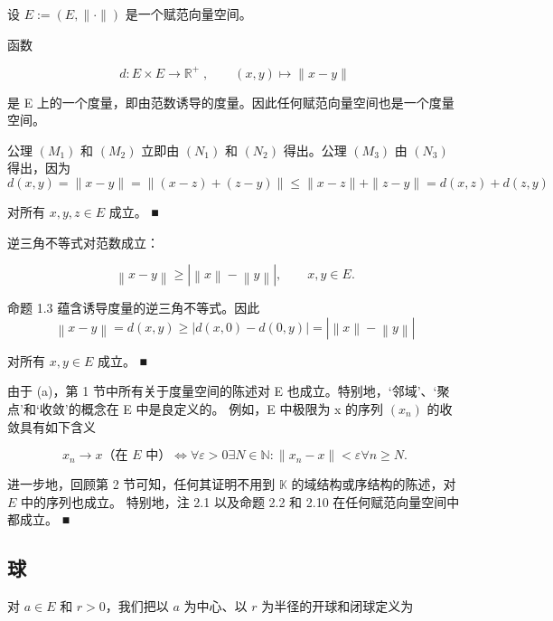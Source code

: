 \begin{remark}

设 $ E := (E, \|\cdot\|) $ 是一个赋范向量空间。

\begin{items}
\item

函数

\[
d\colon E\times E\to\mathbb{R}^{+}\;,\qquad(x,y)\mapsto\|x-y\|
\]

是 E 上的一个度量，即由范数诱导的度量。因此任何赋范向量空间也是一个度量空间。

\proofhead
公理 $(M_{1})$ 和 $(M_{2})$ 立即由 $(N_{1})$ 和 $(N_{2})$ 得出。公理 $(M_{3})$ 由 $(N_{3})$ 得出，因为
\[
d(x,y)=\|x-y\|=\|(x-z)+(z-y)\|\leq\|x-z\|+\|z-y\|=d(x,z)+d(z,y)
\]

对所有 $ x, y, z \in E $ 成立。 ■

\item

逆三角不等式对范数成立：

\[
\left\|x-y\right\|\geq\left|\left\|x\right\|-\left\|y\right\|\right|,\qquad x,y\in E.
\]

\proofhead
命题 1.3 蕴含诱导度量的逆三角不等式。因此
\[
\left\|x-y\right\|=d(x,y)\geq|d(x,0)-d(0,y)|=\left|\left\|x\right\|-\left\|y\right\|\right|
\]

对所有 $ x, y \in E $ 成立。 ■

\item

由于 (a)，第 1 节中所有关于度量空间的陈述对 E 也成立。特别地，‘邻域’、‘聚点’和‘收敛’的概念在 E 中是良定义的。
例如，E 中极限为 x 的序列 $ (x_{n}) $ 的收敛具有如下含义

\[
x_{n}\to x\text{（在 }E\text{ 中）}\Longleftrightarrow\forall\varepsilon>0\exists N\in\mathbb{N}:\|x_{n}-x\|<\varepsilon\forall n\geq N.
\]

进一步地，回顾第 2 节可知，任何其证明不用到 $ \mathbb{K} $ 的域结构或序结构的陈述，对 $ E $ 中的序列也成立。
特别地，注 2.1 以及命题 2.2 和 2.10 在任何赋范向量空间中都成立。 ■

\end{items}

\end{remark}

\subsection*{球}

对 $ a \in E $ 和 $ r > 0 $，我们把以 $ a $ 为中心、以 $ r $ 为半径的开球和闭球定义为

